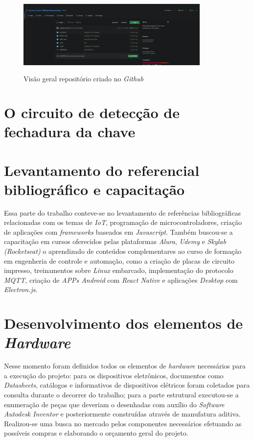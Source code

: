 \begin{figure}[H]
	\centering
	\caption{Visão geral repositório criado no \textit{Github}}
	\includegraphics[width=0.85\textwidth]{figuras/github.png}
	\label{fig:github}
\end{figure}

\section{O circuito de detecção de fechadura da chave} 

\section{Levantamento do referencial bibliográfico e capacitação}
\label{sec:metmodal}

Essa parte do trabalho conteve-se no levantamento de referências bibliográficas relacionadas com os temas de \textit{IoT}, programação de microcontroladores, criação de aplicações com \textit{frameworks} baseados em \textit{Javascript}. Também buscou-se a capacitação em cursos oferecidos pelas plataformas \textit{Alura}, \textit{Udemy} e \textit{Skylab (Rocketseat)} o aprendizado de conteúdos complementares ao curso de formação em engenheria de controle e automação, como a criação de placas de circuito impresso, treinamentos sobre \textit{Linux} embarcado, implementação do protocolo \textit{MQTT}, criação de \textit{APPs Android} com \textit{React Native} e aplicações \textit{Desktop} com \textit{Electron.js}.

\section{Desenvolvimento dos elementos de \textit{Hardware}}
\label{sec: dev_ele_hardware}

Nesse momento foram definidos todos os elementos de \textit{hardware} necessários para a execução do projeto: para os dispositivos eletrônicos, documentos como \textit{Datasheets}, catálogos e informativos de dispositivos elétricos foram coletados para consulta durante o decorrer do trabalho; para a parte estrutural executou-se a enumeração de peças que deveriam o desenhadas com auxílio do \textit{Software Autodesk Inventor} e posteriormente construídas através de manufatura aditiva.  Realizou-se uma busca no mercado pelos componentes necessários efetuando as possíveis compras e elaborando o orçamento geral do projeto. 

